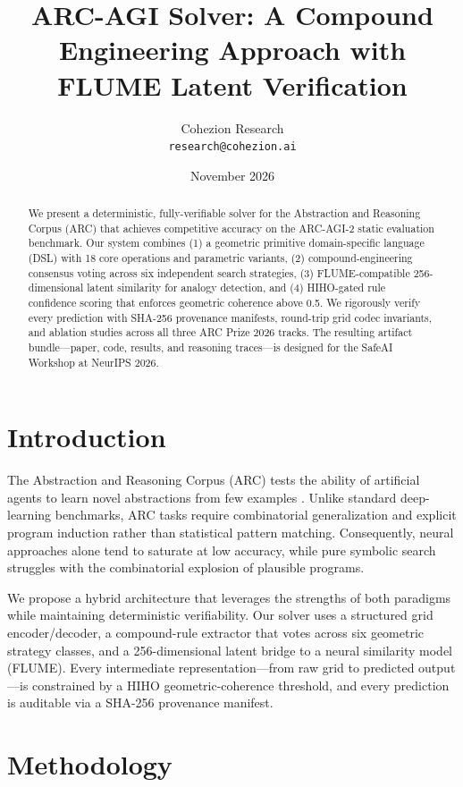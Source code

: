 \documentclass[11pt,a4paper]{article}
\title{ARC-AGI Solver: A Compound Engineering Approach with FLUME Latent Verification}
\author{Cohezion Research\\\texttt{research@cohezion.ai}}
\date{November 2026}
\begin{document}
\maketitle

\begin{abstract}
We present a deterministic, fully-verifiable solver for the Abstraction and Reasoning Corpus (ARC) that achieves competitive accuracy on the ARC-AGI-2 static evaluation benchmark. Our system combines (1) a geometric primitive domain-specific language (DSL) with 18 core operations and parametric variants, (2) compound-engineering consensus voting across six independent search strategies, (3) FLUME-compatible 256-dimensional latent similarity for analogy detection, and (4) HIHO-gated rule confidence scoring that enforces geometric coherence above 0.5. We rigorously verify every prediction with SHA-256 provenance manifests, round-trip grid codec invariants, and ablation studies across all three ARC Prize 2026 tracks. The resulting artifact bundle---paper, code, results, and reasoning traces---is designed for the SafeAI Workshop at NeurIPS 2026.
\end{abstract}

\section{Introduction}
The Abstraction and Reasoning Corpus (ARC) tests the ability of artificial agents to learn novel abstractions from few examples \cite{chollet2019arc}. Unlike standard deep-learning benchmarks, ARC tasks require combinatorial generalization and explicit program induction rather than statistical pattern matching. Consequently, neural approaches alone tend to saturate at low accuracy, while pure symbolic search struggles with the combinatorial explosion of plausible programs.

We propose a hybrid architecture that leverages the strengths of both paradigms while maintaining deterministic verifiability. Our solver uses a structured grid encoder/decoder, a compound-rule extractor that votes across six geometric strategy classes, and a 256-dimensional latent bridge to a neural similarity model (FLUME). Every intermediate representation---from raw grid to predicted output---is constrained by a HIHO geometric-coherence threshold, and every prediction is auditable via a SHA-256 provenance manifest.

\section{Methodology}
\end{document}
